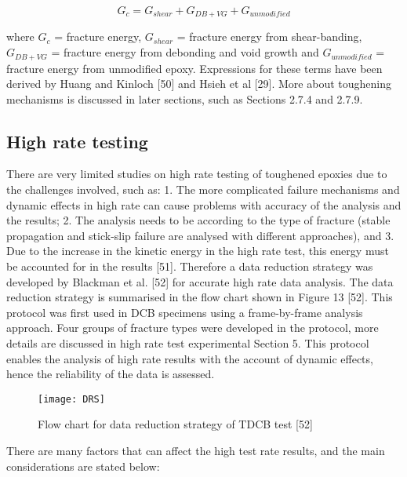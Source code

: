 \documentclass[numbers=noendperiod,chapterprefix=on]{icldt} %
\begin{document}
\begin{equation} 
G_c = G_{shear} + G_{DB+VG} +G_{unmodified}
\end{equation}

where $G_c$ = fracture energy, $G_{shear}$ = fracture energy from shear-banding, $G_{DB+VG}$ = fracture energy from debonding and void growth and $G_{unmodified}$ = fracture energy from unmodified epoxy. Expressions for these terms have been derived by Huang and Kinloch [50] and Hsieh et al [29]. More about toughening mechanisms is discussed in later sections, such as Sections 2.7.4 and 2.7.9.

\subsection{High rate testing}
There are very limited studies on high rate testing of toughened epoxies due to the challenges involved, such as: 1. The more complicated failure mechanisms and dynamic effects in high rate can cause problems with accuracy of the analysis and the results; 2. The analysis needs to be according to the type of fracture (stable propagation and stick-slip failure are analysed with different approaches), and 3. Due to the increase in the kinetic energy in the high rate test, this energy must be accounted for in the results [51].
Therefore a data reduction strategy was developed by Blackman et al. [52] for accurate high rate data analysis. The data reduction strategy is summarised in the flow chart shown in Figure 13 [52]. This protocol was first used in DCB specimens using a frame-by-frame analysis approach. Four groups of fracture types were developed in the protocol, more details are discussed in high rate test experimental Section 5. This protocol enables the analysis of high rate results with the account of dynamic effects, hence the reliability of the data is assessed.

\begin{figure}[!htpb]
\centering
\texttt{[image: DRS]}
\caption{Flow chart for data reduction strategy of TDCB test [52]} %
\end{figure}

There are many factors that can affect the high test rate results, and the main considerations are stated below:
\end{document}
